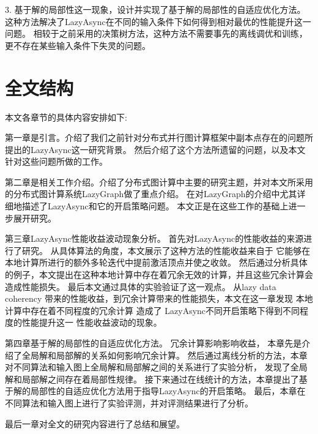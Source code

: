 3. 基于解的局部性这一现象，设计并实现了基于解的局部性的自适应优化方法。
这种方法解决了LazyAsync在不同的输入条件下如何得到相对最优的性能提升这一问题。
相较于之前采用的决策树方法，这种方法不需要事先的离线调优和训练，更不存在某些输入条件下失灵的问题。




\section{全文结构}
本文各章节的具体内容安排如下:

第一章是引言。介绍了我们之前针对分布式并行图计算框架中副本点存在的问题所提出的LazyAsync这一研究背景。
然后介绍了这个方法所遗留的问题，以及本文针对这些问题所做的工作。

第二章是相关工作介绍。介绍了分布式图计算中主要的研究主题，并对本文所采用的分布式图计算系统LazyGraph做了重点介绍。
在对LazyGraph的介绍中尤其详细地描述了LazyAsync和它的开启策略问题。
本文正是在这些工作的基础上进一步展开研究。

第三章LazyAsync性能收益波动现象分析。
首先对LazyAsync的性能收益的来源进行了研究。
从具体算法的角度，本文展示了这种方法的性能收益来自于 它能够在本地计算所进行的额外多轮迭代中提前激活顶点并使之收敛。
然后通过分析具体的例子，本文提出在这种本地计算中存在着冗余无效的计算，并且这些冗余计算会造成性能损失。
最后本文通过具体的实验验证了这一观点。
从lazy data coherency 带来的性能收益，到冗余计算带来的性能损失，本文在这一章发现
本地计算中存在着不同程度的冗余计算
造成了
LazyAsync不同开启策略下得到不同程度的性能提升这一
性能收益波动的现象。

第四章基于解的局部性的自适应优化方法。
冗余计算影响影响收益，
本章先是介绍了全局解和局部解的关系如何影响冗余计算。
然后通过离线分析的方法，本章对不同算法和输入图上全局解和局部解之间的关系进行了实验分析，
发现了全局解和局部解之间存在着局部性规律。
接下来通过在线统计的方法，本章提出了基于解的局部性的自适应优化方法用于指导LazyAsync的开启策略。
最后，本章在不同算法和输入图上进行了实验评测，并对评测结果进行了分析。

最后一章对全文的研究内容进行了总结和展望。





